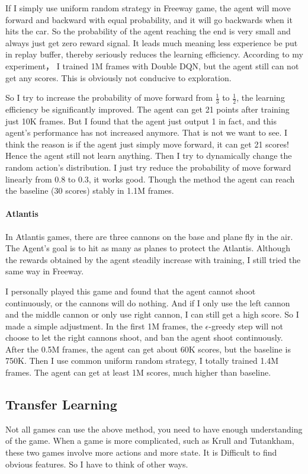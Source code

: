 \documentclass{article}
\begin{document}
If I simply use uniform random strategy in Freeway game, the agent will move forward and backward with equal probability, and it will go backwards when it hits the car. So the probability of the agent reaching the end is very small and always just get zero reward signal. It leads much meaning less experience be put in replay buffer, 
thereby seriously reduces the learning efficiency. According to my experiment， I trained 1M frames
with Double DQN, but the agent still can not get any scores. This is obviously not conducive to exploration.

So I try to increase the probability of move forward from $\frac 1 3$ to $\frac 1 2$, the learning efficiency  be significantly improved. The agent can get 21 points after training just 10K frames. But I found that the agent just output 1 in fact, and this agent's performance has not increased anymore. That is not we want
to see. I think the reason is if the agent just simply move forward, it can get 21 scores! Hence the agent still not learn anything. Then I try to dynamically change the random action's distribution. I just try 
reduce the probability of move forward linearly from 0.8 to 0.3, it works good. Though the method the agent
can reach the baseline (30 scores) stably in 1.1M frames.

\paragraph{Atlantis}
In Atlantis games, there are three cannons on the base and plane fly in the air. The Agent's goal is to hit as many as planes to protect the Atlantis. Although the rewards obtained by the agent steadily increase with training, I still tried the same way in Freeway. 

I personally played this game and found that the agent cannot shoot continuously, or the cannons will do nothing. And if I only use the left
cannon and the middle cannon or only use right cannon, I can still get a high score. So I made a simple adjustment. In the first 1M frames, the $\epsilon$-greedy step will not choose to let the right cannons shoot, and ban the agent shoot continuously. After the 0.5M frames, the agent can get about 60K scores, but the baseline is 750K. Then I use common uniform random strategy, I totally trained 1.4M frames. The agent can get
at least 1M scores, much higher than baseline.

\subsection{Transfer Learning}
Not all games can use the above method, you need to have enough understanding of the game. 
When a game is more complicated, such as Krull and Tutankham, these two games involve more actions 
and more state. It is Difficult to find obvious features. So I have to think of other ways.
\end{document}
